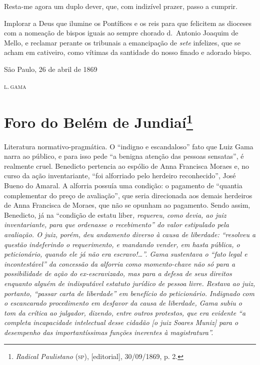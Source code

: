 Resta-me agora um duplo dever, que, com indizível prazer, passo a
cumprir.

Implorar a Deus que ilumine os Pontífices e os reis para que felicitem
as dioceses com a nomeação de bispos iguais ao sempre chorado d.~Antonio
Joaquim de Mello, e reclamar perante os tribunais a emancipação de
\emph{sete} infelizes, que se acham em cativeiro, como vítimas da
santidade do nosso finado e adorado bispo.

\begin{flushright}
São Paulo, 26 de abril de 1869

\textsc{l.\,gama}
\end{flushright}

\chapter{Foro do Belém de Jundiaí\footnote{\emph{Radical Paulistano}
  (\textsc{sp}), {[}editorial{]}, 30/09/1869, p. 2.}}

\begin{didascalia}
Literatura normativo-pragmática. O ``indigno e escandaloso'' fato que Luiz
Gama narra ao público, e para isso pede ``a benigna atenção das pessoas
sensatas'', é realmente cruel. Benedicto pertencia ao espólio de Anna
Francisca Moraes e, no curso da ação inventariante, ``foi alforriado pelo
herdeiro reconhecido'', José Bueno do Amaral. A alforria possuía uma
condição: o pagamento de ``quantia complementar do preço de avaliação'',
que seria direcionada aos demais herdeiros de Anna Francisca de Moraes,
que não se opunham ao pagamento. Sendo assim, Benedicto, já na ``condição
de estatu liber\emph{, requereu, como devia, ao juiz inventariante,
para que ordenasse o recebimento'' do valor estipulado pela avaliação. O
juiz, porém, deu andamento diverso à causa de liberdade: ``resolveu a
questão indeferindo o requerimento, e mandando vender, em hasta pública,
o peticionário, quando ele já não era escravo!\ldots{}''. Gama sustentava o
``fato legal e incontestável'' da concessão da alforria como momento-chave
não só para a possibilidade de ação do ex-escravizado, mas para a defesa
de seus direitos enquanto alguém de indisputável estatuto jurídico de
pessoa livre. Restava ao juiz, portanto, ``passar carta de liberdade'' em
benefício do peticionário. Indignado com o escancarado procedimento em
desfavor da causa de liberdade, Gama subiu o tom da crítica ao julgador,
dizendo, entre outros protestos, que era evidente ``a completa
incapacidade intelectual desse cidadão {[}o juiz Soares Muniz{]} para o
desempenho das importantíssimas funções inerentes à magistratura''.}
\end{didascalia}



